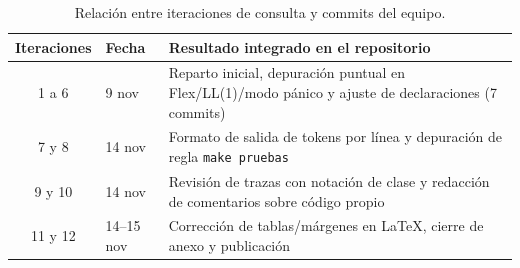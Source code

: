 \documentclass[12pt]{article}
\newcommand{\cmd}[1]{\texttt{\small #1}}
\begin{document}
\begin{table}[H]
\centering\small
\begin{tabularx}{\textwidth}{@{}c l X@{}}
\toprule
\textbf{Iteraciones} & \textbf{Fecha} & \textbf{Resultado integrado en el repositorio} \\
\midrule
1 a 6 & 9 nov & Reparto inicial, depuración puntual en Flex/LL(1)/modo pánico y ajuste de declaraciones (7 commits) \\
7 y 8 & 14 nov & Formato de salida de tokens por línea y depuración de regla \cmd{make pruebas} \\
9 y 10 & 14 nov & Revisión de trazas con notación de clase y redacción de comentarios sobre código propio \\
11 y 12 & 14--15 nov & Corrección de tablas/márgenes en LaTeX, cierre de anexo y publicación \\
\bottomrule
\end{tabularx}
\caption{Relación entre iteraciones de consulta y commits del equipo.}
\end{table}
\end{document}
